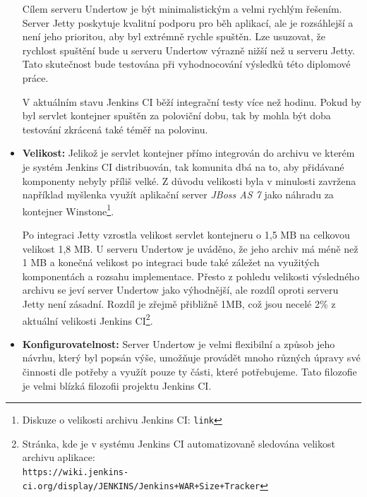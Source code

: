 \begin{itemize}
{                    Cílem serveru Undertow je být minimalistickým a velmi rychlým 
                    řešením. Server Jetty poskytuje kvalitní podporu pro běh aplikací, ale je 
                    rozsáhlejší a není jeho prioritou, aby byl extrémně rychle spuštěn.
                    Lze usuzovat, že rychlost spuštění bude u serveru Undertow výrazně nižší
                    než u serveru Jetty. Tato skutečnost bude testována při vyhodnocování
                    výsledků této diplomové práce.

                    V aktuálním stavu Jenkins CI běží integrační testy více než hodinu. Pokud 
                    by byl servlet kontejner spuštěn za poloviční dobu, tak by mohla být doba testování
                    zkrácená také téměř na polovinu.

                    }

                \item{\textbf{Velikost:} Jelikož je servlet kontejner přímo integrován do archivu ve kterém
                    je systém Jenkins CI distribuován, tak komunita dbá na to, aby přidávané komponenty
                    nebyly příliš velké. Z důvodu velikosti byla v minulosti zavržena například
                    myšlenka využít aplikační server \emph{JBoss AS 7} jako náhradu za kontejner
                    Winstone\footnote{Diskuze o velikosti archivu Jenkins CI: \texttt{link}}. %
                    
                    Po integraci Jetty vzrostla velikost servlet kontejneru o 1,5 MB na celkovou
                    velikost 1,8 MB. U serveru Undertow je uváděno, že jeho archiv má méně
                    než 1 MB a konečná velikost po integraci bude také záležet na využitých komponentách
                    a rozsahu implementace. Přesto z pohledu velikosti výsledného archivu
                    se jeví server Undertow jako výhodnější, ale rozdíl oproti serveru Jetty není zásadní.
                    Rozdíl je zřejmě přibližně 1MB, což jsou necelé 2\% z aktuální velikosti
                    Jenkins CI\footnote{Stránka, kde je v systému Jenkins CI automatizovaně
                    sledována velikost archivu aplikace:\\ 
                    \texttt{https://wiki.jenkins-ci.org/display/JENKINS/Jenkins+WAR+Size+Tracker}}.}

                \item{\textbf{Konfigurovatelnost:} Server Undertow je velmi flexibilní a způsob
                    jeho návrhu, který byl popsán výše, umožňuje provádět mnoho různých úpravy 
                    své činnosti dle potřeby a využít pouze ty části, které potřebujeme.
                    Tato filozofie je velmi blízká filozofii projektu Jenkins CI. 
                    
}
\end{itemize}
